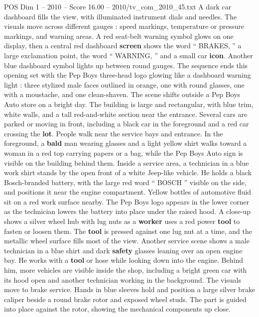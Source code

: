 \begin{textsample}{POS Dim 1 – 2010 – Score 16.00 – 2010/tv\_com\_2010\_45.txt}  \label{ex:f1_pos_026}
A dark car dashboard fills the view, with illuminated instrument dials and needles.
The visuals move across different gauges : speed markings, temperature or pressure markings, and warning areas.
A red seat-belt warning symbol glows on one display, then a central red dashboard \textbf{screen} shows the word “ BRAKES, ” a large exclamation point, the word “ WARNING, ” and a small car \textbf{icon}.
Another blue dashboard symbol lights up between round gauges.
The sequence ends this opening set with the Pep Boys three-head logo glowing like a dashboard warning light : three stylized male faces outlined in orange, one with round glasses, one with a moustache, and one clean-shaven.
The scene shifts outside a Pep Boys Auto store on a bright day.
The building is large and rectangular, with blue trim, white walls, and a tall red-and-white section near the entrance.
Several cars are parked or moving in front, including a black car in the foreground and a red car crossing the \textbf{lot}.
People walk near the service bays and entrance.
In the foreground, a \textbf{bald} man wearing glasses and a light yellow shirt walks toward a woman in a red top carrying papers or a bag, while the Pep Boys Auto sign is visible on the building behind them.
Inside a service area, a technician in a blue work shirt stands by the open front of a white Jeep-like vehicle.
He holds a black Bosch-branded battery, with the large red word “ BOSCH ” visible on the side, and positions it near the engine compartment.
Yellow bottles of automotive fluid sit on a red work surface nearby.
The Pep Boys logo appears in the lower corner as the technician lowers the battery into place under the raised hood.
A close-up shows a silver wheel hub with lug nuts as a \textbf{worker} uses a red power \textbf{tool} to fasten or loosen them.
The \textbf{tool} is pressed against one lug nut at a time, and the metallic wheel surface fills most of the view.
Another service scene shows a male technician in a blue shirt and dark \textbf{safety} glasses leaning over an open engine bay.
He works with a \textbf{tool} or hose while looking down into the engine.
Behind him, more vehicles are visible inside the shop, including a bright green car with its hood open and another technician working in the background.
The visuals move to brake service.
Hands in blue sleeves hold and position a large silver brake caliper beside a round brake rotor and exposed wheel studs.
The part is guided into place against the rotor, showing the mechanical components up close.

\end{textsample}
